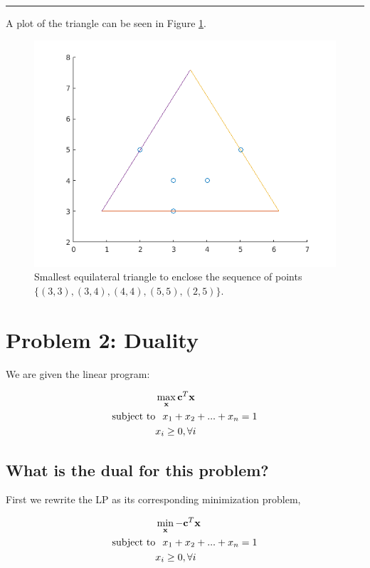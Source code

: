 \documentclass{article}
\begin{document}
\vspace{0.25in}
\hrule
\vspace{0.25in}

\noindent A plot of the triangle can be seen in Figure \ref{fig:triangle}.

\begin{figure} \label{fig:triangle}
	\centering
	\includegraphics[width=0.75\linewidth]{results-1}
	\caption{Smallest equilateral triangle to enclose the sequence of points $\{(3,3), (3,4), (4,4), (5,5), (2,5)\}$.}
\end{figure}

\newpage

\section{Problem 2: Duality}

We are given the linear program:

\begin{align*}
&\max_\mathbf{x} \mathbf{c}^T \mathbf{x} \\
\text{subject to} & \hspace{0.1in} x_1 + x_2 + ... + x_n = 1\\
&x_i \ge 0, \forall i
\end{align*}

\subsection{What is the dual for this problem?}

First we rewrite the LP as its corresponding minimization problem,

\begin{align*}
&\min_\mathbf{x} -\mathbf{c}^T \mathbf{x} \\
\text{subject to} & \hspace{0.1in} x_1 + x_2 + ... + x_n = 1\\
&x_i \ge 0, \forall i
\end{align*}
\end{document}
